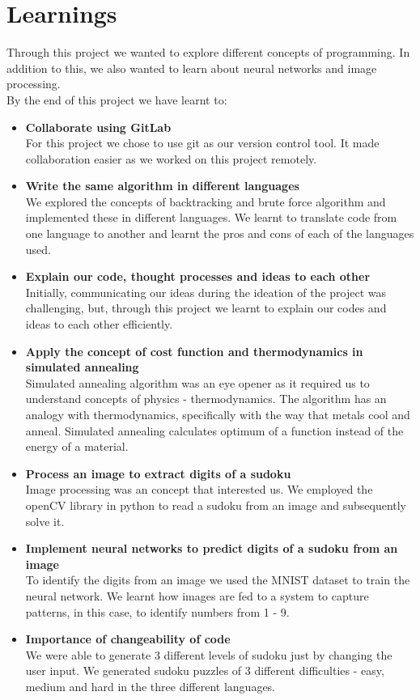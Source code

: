 \documentclass[12pt]{article}
\begin{document}
    \section{Learnings}
    Through this project we wanted to explore different concepts of programming. In addition to this, we also wanted to learn about neural networks and image processing.\\
    By the end of this project we have learnt to:
     \begin{itemize}
		 \item \textbf{Collaborate using GitLab}\\
		 For this project we chose to use git as our version control tool. It made collaboration easier as we worked on this project remotely. 
		 \item \textbf{Write the same algorithm in different languages}\\
		 We explored the concepts of backtracking and brute force algorithm and implemented these in different languages. We learnt to translate code from one language to another and learnt the pros and cons of each of the languages used. 
		 \item \textbf{Explain our code, thought processes and ideas to each other}\\
		 Initially, communicating our ideas during the ideation of the project was challenging, but, through this project we learnt to explain our codes and ideas to each other efficiently.
		 \item \textbf{Apply the concept of cost function and thermodynamics in simulated annealing}\\
		 Simulated annealing algorithm was an eye opener as it required us to understand concepts of physics - thermodynamics.  The algorithm has an analogy with thermodynamics, specifically with the way that metals cool and anneal.  Simulated annealing calculates optimum of a function instead of the energy of a material.
		 \item \textbf{Process an image to extract digits of a sudoku}\\
		 Image processing was an concept that interested us. We employed the openCV library in python to read a sudoku from an image and subsequently solve it.
		 \item \textbf{Implement neural networks to predict digits of a sudoku from an image}\\
		 To identify the digits from an image we used the MNIST dataset to train the neural network. We learnt how images are fed to a system to capture patterns, in this case, to identify numbers from 1 - 9.
		 \item \textbf{Importance of changeability of code}\\
		 We were able to generate 3 different levels of sudoku just by changing the user input. We generated sudoku puzzles of 3 different difficulties - easy, medium and hard in the three different languages.
	 \end{itemize}
	 
\end{document}
